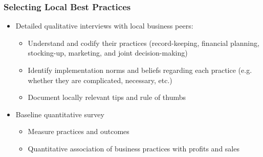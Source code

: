 \documentclass[10pt]{beamer}
\begin{document}
\begin{frame}
\frametitle{Selecting Local Best Practices}
\begin{itemize}
\item Detailed \textcolor[rgb]{0.00,0.07,1.00}{qualitative interviews} with local business peers:
    \begin{itemize}
    \item Understand and codify their practices (record-keeping, financial planning, stocking-up, marketing, and joint decision-making)
    \item Identify implementation norms and beliefs regarding each practice (e.g. whether they are complicated, necessary, etc.)
    \item Document locally relevant tips and rule of thumbs
    \end{itemize}
\vspace{0.2in}
\item Baseline \textcolor[rgb]{0.00,0.07,1.00}{quantitative survey}
    \begin{itemize}
    \item Measure practices and outcomes
    \item Quantitative association of business practices with profits and sales
    \end{itemize}
\end{itemize}
\end{frame}
\end{document}
